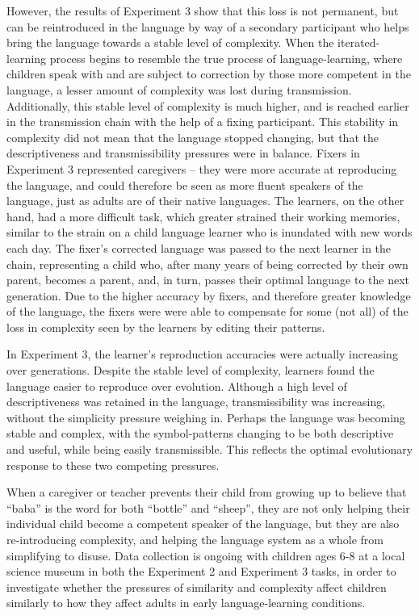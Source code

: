 \documentclass[10pt, letterpaper]{article}
\begin{document}
However, the results of Experiment 3 show that this loss is not
permanent, but can be reintroduced in the language by way of a secondary
participant who helps bring the language towards a stable level of
complexity. When the iterated-learning process begins to resemble the
true process of language-learning, where children speak with and are
subject to correction by those more competent in the language, a lesser
amount of complexity was lost during transmission. Additionally, this
stable level of complexity is much higher, and is reached earlier in the
transmission chain with the help of a fixing participant. This stability
in complexity did not mean that the language stopped changing, but that
the descriptiveness and transmissibility pressures were in balance.
Fixers in Experiment 3 represented caregivers -- they were more accurate
at reproducing the language, and could therefore be seen as more fluent
speakers of the language, just as adults are of their native languages.
The learners, on the other hand, had a more difficult task, which
greater strained their working memories, similar to the strain on a
child language learner who is inundated with new words each day. The
fixer's corrected language was passed to the next learner in the chain,
representing a child who, after many years of being corrected by their
own parent, becomes a parent, and, in turn, passes their optimal
language to the next generation. Due to the higher accuracy by fixers,
and therefore greater knowledge of the language, the fixers were were
able to compensate for some (not all) of the loss in complexity seen by
the learners by editing their patterns.

In Experiment 3, the learner's reproduction accuracies were actually
increasing over generations. Despite the stable level of complexity,
learners found the language easier to reproduce over evolution. Although
a high level of descriptiveness was retained in the language,
transmissibility was increasing, without the simplicity pressure
weighing in. Perhaps the language was becoming stable and complex, with
the symbol-patterns changing to be both descriptive and useful, while
being easily transmissible. This reflects the optimal evolutionary
response to these two competing pressures.

When a caregiver or teacher prevents their child from growing up to
believe that ``baba'' is the word for both ``bottle'' and ``sheep'',
they are not only helping their individual child become a competent
speaker of the language, but they are also re-introducing complexity,
and helping the language system as a whole from simplifying to disuse.
Data collection is ongoing with children ages 6-8 at a local science
museum in both the Experiment 2 and Experiment 3 tasks, in order to
investigate whether the pressures of similarity and complexity affect
children similarly to how they affect adults in early language-learning
conditions.
\end{document}
